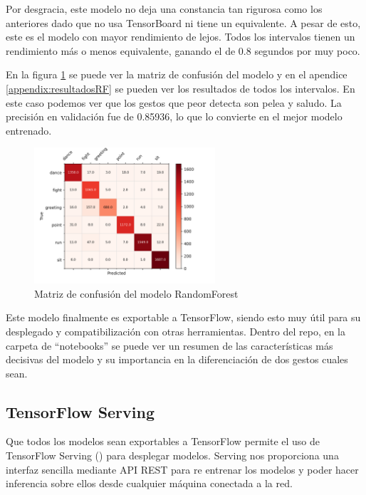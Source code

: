 Por desgracia, este modelo no deja una constancia tan rigurosa como los anteriores dado que no usa TensorBoard ni tiene un equivalente. A pesar de esto, este es el modelo con mayor rendimiento de lejos. Todos los intervalos tienen un rendimiento más o menos equivalente, ganando el de 0.8 segundos por muy poco.

En la figura \ref{fig:rf-0.8-matriz-ejemplo} se puede ver la matriz de confusión del modelo y en el apendice \ref{appendix:resultadosRF} se pueden ver los resultados de todos los intervalos. En este caso podemos ver que los gestos que peor detecta son pelea y saludo. La precisión en validación fue de 0.85936, lo que lo convierte en el mejor modelo entrenado.

\begin{figure}[H]
    \centering
    \includegraphics[width=0.6\textwidth]{Imagenes/Bitmap/CM_best_rf_0.8.png}
    \caption{Matriz de confusión del modelo RandomForest}
    \label{fig:rf-0.8-matriz-ejemplo}
\end{figure}

Este modelo finalmente es exportable a TensorFlow, siendo esto muy útil para su desplegado y compatibilización con otras herramientas. Dentro del repo, en la carpeta de ``notebooks'' se puede ver un resumen de las características más decisivas del modelo y su importancia en la diferenciación de dos gestos cuales sean.

\subsection{TensorFlow Serving}

Que todos los modelos sean exportables a TensorFlow permite el uso de TensorFlow Serving (\cite{olston2017tensorflowservingflexiblehighperformanceml}) para desplegar modelos. Serving nos proporciona una interfaz sencilla mediante \gls{API REST} para re entrenar los modelos y poder hacer inferencia sobre ellos desde cualquier máquina conectada a la red.

